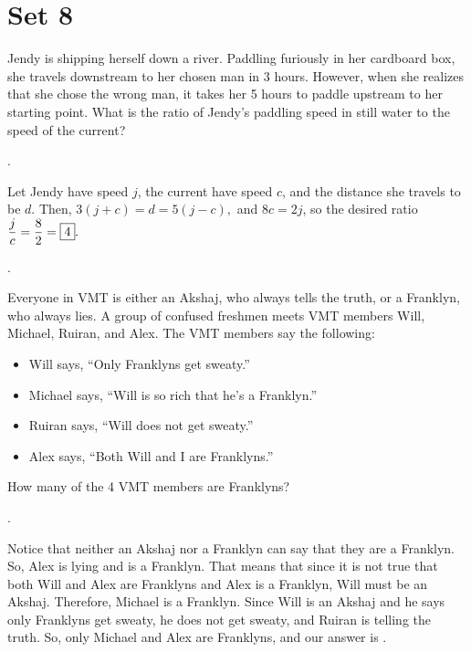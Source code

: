 \documentclass[11pt]{article}
\DeclareRobustCommand{\frac}[3][0pt]{%
  {\begingroup\hspace{#1}#2\hspace{#1}\endgroup\over\hspace{#1}#3\hspace{#1}}}
\begin{document}
\eject

\section*{Set 8}

\begin{problem}Jendy is shipping herself down a river. Paddling furiously in her cardboard box, she travels downstream to her chosen man in 3 hours. However, when she realizes that she chose the wrong man, it takes her 5 hours to paddle upstream to her starting point. What is the ratio of Jendy's paddling speed in still water to the speed of the current?
\end{problem}

\begin{answer} . \end{answer}
\begin{solution}
Let Jendy have speed $j$, the current have speed $c$, and the distance she travels to be $d$. Then, $3(j + c) = d = 5(j- c),$ and $8c = 2j$, so the desired ratio $\displaystyle \frac{j}{c} = \frac{8}{2} = \boxed{4}.$
\end{solution}.

\begin{problem}
Everyone in VMT is either an Akshaj, who always tells the truth, or a Franklyn, who always lies. A group of confused freshmen meets VMT members Will, Michael, Ruiran, and Alex. The VMT members say the following:
	\begin{itemize}
    	\item Will says, ``Only Franklyns get sweaty.''
    	\item Michael says, ``Will is so rich that he's a Franklyn.''
    	\item Ruiran says, ``Will does not get sweaty.''
    	\item Alex says, ``Both Will and I are Franklyns.''
	\end{itemize}
	How many of the 4 VMT members are Franklyns?
\end{problem}

\begin{answer} . \end{answer}
\begin{solution}
Notice that neither an Akshaj nor a Franklyn can say that they are a Franklyn. So, Alex is lying and is a Franklyn. That means that since it is not true that both Will and Alex are Franklyns and Alex is a Franklyn, Will must be an Akshaj. Therefore, Michael is a Franklyn. Since Will is an Akshaj and he says only Franklyns get sweaty, he does not get sweaty, and Ruiran is telling the truth. So, only Michael and Alex are Franklyns, and our answer is .
\end{solution}
\end{document}
